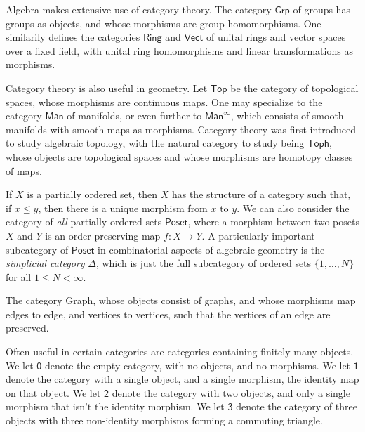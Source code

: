 \begin{example}
    Algebra makes extensive use of category theory. The category $\mathsf{Grp}$ of groups has groups as objects, and whose morphisms are group homomorphisms. One similarily defines the categories $\mathsf{Ring}$ and $\mathsf{Vect}$ of unital rings and vector spaces over a fixed field, with unital ring homomorphisms and linear transformations as morphisms.
\end{example}

\begin{example}
    Category theory is also useful in geometry. Let $\mathsf{Top}$ be the category of topological spaces, whose morphisms are continuous maps. One may specialize to the category $\mathsf{Man}$ of manifolds, or even further to $\mathsf{Man}^\infty$, which consists of smooth manifolds with smooth maps as morphisms. Category theory was first introduced to study algebraic topology, with the natural category to study being $\mathsf{Toph}$, whose objects are topological spaces and whose morphisms are homotopy classes of maps.
\end{example}

\begin{example}
    If $X$ is a partially ordered set, then $X$ has the structure of a category such that, if $x \leq y$, then there is a unique morphism from $x$ to $y$. We can also consider the category of \emph{all} partially ordered sets $\mathsf{Poset}$, where a morphism between two posets $X$ and $Y$ is an order preserving map $f: X \to Y$. A particularly important subcategory of $\mathsf{Poset}$ in combinatorial aspects of algebraic geometry is the \emph{simplicial category} $\Delta$, which is just the full subcategory of ordered sets $\{ 1, \dots, N \}$ for all $1 \leq N < \infty$.
\end{example}

\begin{example}
    The category {\sf Graph}, whose objects consist of graphs, and whose morphisms map edges to edge, and vertices to vertices, such that the vertices of an edge are preserved.
\end{example}

\begin{example}
    Often useful in certain categories are categories containing finitely many objects. We let $\mathsf{0}$ denote the empty category, with no objects, and no morphisms. We let $\mathsf{1}$ denote the category with a single object, and a single morphism, the identity map on that object. We let $\mathsf{2}$ denote the category with two objects, and only a single morphism that isn't the identity morphism. We let $\mathsf{3}$ denote the category of three objects with three non-identity morphisms forming a commuting triangle.
\end{example}

